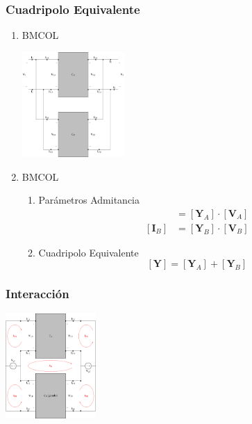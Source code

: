 \subsubsection{Cuadripolo Equivalente}
\label{sec:org0bc310b}
\begin{enumerate}
\item \hfill{}\textsc{BMCOL}
\label{sec:org0d6fdf5}
\begin{center}
\includegraphics[height=4cm]{../figs/paralelo-paralelo.pdf}
\end{center}


\item \hfill{}\textsc{BMCOL}
\label{sec:org582370f}
\begin{enumerate}
\item Parámetros Admitancia
\label{sec:org0aeffe8}
\begin{align*}
  [\mathbf{I}_A] &= [\mathbf{Y}_A] \cdot [\mathbf{V}_A]\\
  [\mathbf{I}_B] &= [\mathbf{Y}_B] \cdot [\mathbf{V}_B]
\end{align*}

\item Cuadripolo Equivalente
\label{sec:orgdcc9958}
\[
  \boxed{[\mathbf{Y}] = [\mathbf{Y}_A] + [\mathbf{Y}_B]}
\]
\end{enumerate}
\end{enumerate}
\subsubsection{Interacción}
\label{sec:orgd584cd4}
\begin{center}
\includegraphics[height=4cm]{../figs/paralelo-paralelo-interaccion.pdf}
\end{center}
